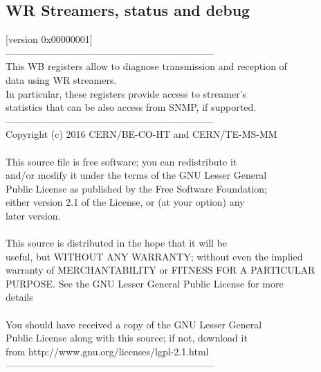 \subsection{WR Streamers, status and debug}
\label{subsec:wbgen:wr_streamers}
[version 0x00000001]\\
-----------------------------------------------------------------\\  This WB registers allow to diagnose transmission and reception of\\  data using WR streamers.                                         \\  In particular, these registers provide access to streamer's      \\  statistics that can be also access from SNMP, if supported.      \\  -----------------------------------------------------------------\\  Copyright (c) 2016 CERN/BE-CO-HT and CERN/TE-MS-MM               \\                                                                   \\  This source file is free software; you can redistribute it       \\  and/or modify it under the terms of the GNU Lesser General       \\  Public License as published by the Free Software Foundation;     \\  either version 2.1 of the License, or (at your option) any       \\  later version.                                                   \\                                                                   \\  This source is distributed in the hope that it will be           \\  useful, but WITHOUT ANY WARRANTY; without even the implied       \\  warranty of MERCHANTABILITY or FITNESS FOR A PARTICULAR          \\  PURPOSE.  See the GNU Lesser General Public License for more     \\  details                                                          \\                                                                   \\  You should have received a copy of the GNU Lesser General        \\  Public License along with this source; if not, download it       \\  from http://www.gnu.org/licenses/lgpl-2.1.html                   \\  -----------------------------------------------------------------
